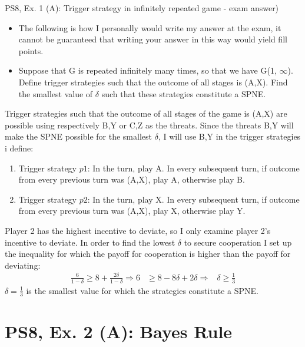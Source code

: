 \begin{frame}{PS8, Ex. 1 (A): Trigger strategy in infinitely repeated game - exam answer)}
    \begin{itemize}
        \item The following is how I personally would write my answer at the exam, it cannot be guaranteed that writing your answer in this way would yield fill points.
        \item[(a)] Suppose that G is repeated infinitely many times, so that we have G(1, $\infty$). Define trigger strategies such that the outcome of all stages is (A,X). Find the smallest value of $\delta$ such that these strategies constitute a SPNE.
    \end{itemize}
  \begin{multicols}{2}
  Trigger strategies such that the outcome of all stages of the game is (A,X) are possible using respectively B,Y or C,Z as the threats. Since the threats B,Y will make the SPNE possible for the smallest $\delta$, I will use B,Y in the trigger strategies i define: \\
    \begin{enumerate}
    \item Trigger strategy $p1$: In the  turn, play A. In every subsequent turn, if outcome from every previous turn was (A,X), play A, otherwise play B.
    \item Trigger strategy $p2$: In the  turn, play X. In every subsequent turn, if outcome from every previous turn was (A,X), play X, otherwise play Y.
    \end{enumerate}
    \vfill\null\columnbreak
    Player 2 has the highest incentive to deviate, so I only examine player 2's incentive to deviate. In order to find the lowest $\delta$ to secure cooperation I set up the inequality for which the payoff for cooperation is higher than the payoff for deviating:
    \begin{align}
    \frac{6}{1-\delta} \geq 8 + \frac{2\delta}{1-\delta} \Rightarrow 6 & \geq 8 - 8\delta + 2\delta \Rightarrow & \delta \geq \frac{1}{3}
    \end{align}
    $\delta=\frac{1}{3}$ is the smallest value for which the strategies constitute a SPNE.    
    \vfill\null
  \end{multicols}
\end{frame}

\section{PS8, Ex. 2 (A): Bayes Rule}

